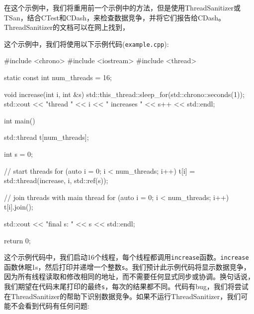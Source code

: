在这个示例中，我们将重用前一个示例中的方法，但是使用ThreadSanitizer或TSan，结合CTest和CDash，来检查数据竞争，并将它们报告给CDash。ThreadSanitizer的文档可以在网上找到，


这个示例中，我们将使用以下示例代码(\texttt{example.cpp}):

\begin{codebox}[cpp]
#include <chrono>
#include <iostream>
#include <thread>

static const int num_threads = 16;

void increase(int i, int &s) {
  std::this_thread::sleep_for(std::chrono::seconds(1));
  std::cout << "thread " << i << " increases " << s++ << std::endl;
}

int main() {
  std::thread t[num_threads];
  
  int s = 0;
  
  // start threads
  for (auto i = 0; i < num_threads; i++) {
    t[i] = std::thread(increase, i, std::ref(s));
  }
  
  // join threads with main thread
  for (auto i = 0; i < num_threads; i++) {
    t[i].join();
  }
  
  std::cout << "final s: " << s << std::endl;
  
  return 0;
}
\end{codebox}

这个示例代码中，我们启动16个线程，每个线程都调用\texttt{increase}函数。\texttt{increase}函数休眠1s，然后打印并递增一个整数\texttt{s}。我们预计此示例代码将显示数据竞争，因为所有线程读取和修改相同的地址，而不需要任何显式同步或协调。换句话说，我们期望在代码末尾打印的最终\texttt{s}，每次的结果都不同。代码有bug，我们将尝试在ThreadSanitizer的帮助下识别数据竞争。如果不运行ThreadSanitizer，我们可能不会看到代码有任何问题:



